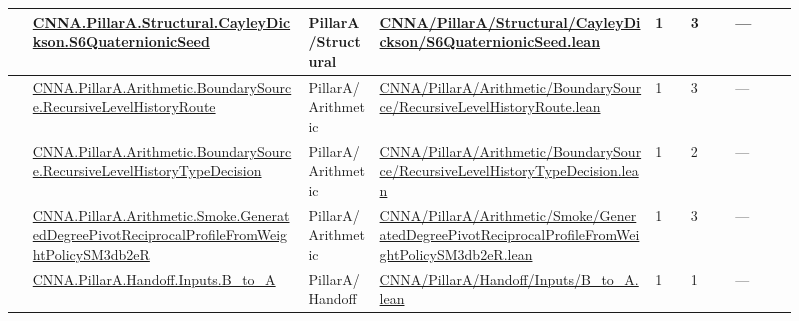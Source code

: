\begin{longtable}{L{0.025\linewidth} L{0.315\linewidth} L{0.08\linewidth} L{0.315\linewidth} L{0.045\linewidth} L{0.055\linewidth} L{0.07\linewidth}}
\hline
{} & \href{run:repo_snapshot/CNNA/PillarA/Structural/CayleyDickson/S6QuaternionicSeed.lean}{CNNA.\allowbreak{}PillarA.\allowbreak{}Structural.\allowbreak{}CayleyDickson.\allowbreak{}S6QuaternionicSeed} & PillarA/\allowbreak{}Structural & \href{run:repo_snapshot/CNNA/PillarA/Structural/CayleyDickson/S6QuaternionicSeed.lean}{CNNA/\allowbreak{}PillarA/\allowbreak{}Structural/\allowbreak{}CayleyDickson/\allowbreak{}S6QuaternionicSeed.\allowbreak{}lean} & 1 & 3 & ---\\
\hline
{} & \href{run:repo_snapshot/CNNA/PillarA/Arithmetic/BoundarySource/RecursiveLevelHistoryRoute.lean}{CNNA.\allowbreak{}PillarA.\allowbreak{}Arithmetic.\allowbreak{}BoundarySource.\allowbreak{}RecursiveLevelHistoryRoute} & PillarA/\allowbreak{}Arithmetic & \href{run:repo_snapshot/CNNA/PillarA/Arithmetic/BoundarySource/RecursiveLevelHistoryRoute.lean}{CNNA/\allowbreak{}PillarA/\allowbreak{}Arithmetic/\allowbreak{}BoundarySource/\allowbreak{}RecursiveLevelHistoryRoute.\allowbreak{}lean} & 1 & 3 & ---\\
\hline
{} & \href{run:repo_snapshot/CNNA/PillarA/Arithmetic/BoundarySource/RecursiveLevelHistoryTypeDecision.lean}{CNNA.\allowbreak{}PillarA.\allowbreak{}Arithmetic.\allowbreak{}BoundarySource.\allowbreak{}RecursiveLevelHistoryTypeDecision} & PillarA/\allowbreak{}Arithmetic & \href{run:repo_snapshot/CNNA/PillarA/Arithmetic/BoundarySource/RecursiveLevelHistoryTypeDecision.lean}{CNNA/\allowbreak{}PillarA/\allowbreak{}Arithmetic/\allowbreak{}BoundarySource/\allowbreak{}RecursiveLevelHistoryTypeDecision.\allowbreak{}lean} & 1 & 2 & ---\\
\hline
{} & \href{run:repo_snapshot/CNNA/PillarA/Arithmetic/Smoke/GeneratedDegreePivotReciprocalProfileFromWeightPolicySM3db2eR.lean}{CNNA.\allowbreak{}PillarA.\allowbreak{}Arithmetic.\allowbreak{}Smoke.\allowbreak{}GeneratedDegreePivotReciprocalProfileFromWeightPolicySM3db2eR} & PillarA/\allowbreak{}Arithmetic & \href{run:repo_snapshot/CNNA/PillarA/Arithmetic/Smoke/GeneratedDegreePivotReciprocalProfileFromWeightPolicySM3db2eR.lean}{CNNA/\allowbreak{}PillarA/\allowbreak{}Arithmetic/\allowbreak{}Smoke/\allowbreak{}GeneratedDegreePivotReciprocalProfileFromWeightPolicySM3db2eR.\allowbreak{}lean} & 1 & 3 & ---\\
\hline
{} & \href{run:repo_snapshot/CNNA/PillarA/Handoff/Inputs/B_to_A.lean}{CNNA.\allowbreak{}PillarA.\allowbreak{}Handoff.\allowbreak{}Inputs.\allowbreak{}B\_to\_A} & PillarA/\allowbreak{}Handoff & \href{run:repo_snapshot/CNNA/PillarA/Handoff/Inputs/B_to_A.lean}{CNNA/\allowbreak{}PillarA/\allowbreak{}Handoff/\allowbreak{}Inputs/\allowbreak{}B\_to\_A.\allowbreak{}lean} & 1 & 1 & ---\\

\end{longtable}
